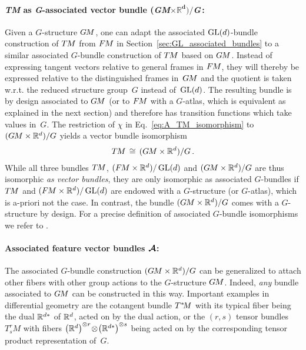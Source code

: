 \paragraph{\textit{TM} as \textit{G}-associated vector bundle (\textit{GM}$\boldsymbol{\times \mathds{R}^d)/}$\textit{G}\,:}

Given a $G$-structure $G\mkern-1.4muM$, one can adapt the associated $\operatorname{GL}(d)$-bundle construction of $T\mkern-1.5muM$ from $F\mkern-1.5muM$ in Section~\ref{sec:GL_associated_bundles} to a similar associated $G$-bundle construction of $T\mkern-1.5muM$ based on $G\mkern-1.4muM$.
Instead of expressing tangent vectors relative to general frames in $F\mkern-1.5muM$, they will thereby be expressed relative to the distinguished frames in~$G\mkern-1.4muM$ and the quotient is taken w.r.t. the reduced structure group~$G$ instead of~$\operatorname{GL}(d)$.
The resulting bundle is by design associated to $G\mkern-1.4muM$ (or to $F\mkern-1.5muM$ with a $G$-atlas, which is equivalent as explained in the next section) and therefore has transition functions which take values in~$G$.
The restriction of $\chi$ in Eq.~\eqref{eq:A_TM_isomorphism} to $(G\mkern-1.4muM\times\mathbb{R}^d)/G$ yields a vector bundle isomorphism
\begin{align}
    T\mkern-1.5muM\, \cong\, (G\mkern-1.4muM\times\mathbb{R}^d)/G \,.
\end{align}
While all three bundles $T\mkern-1.5muM$, $(F\mkern-1.5muM\times\mathbb{R}^d)/\operatorname{GL}(d)$ and $(G\mkern-1.4muM\times\mathbb{R}^d)/G$ are thus isomorphic \emph{as vector bundles}, they are only isomorphic as associated $G$-bundles if $T\mkern-1.5muM$ and $(F\mkern-1.5muM\times\mathbb{R}^d)/\operatorname{GL}(d)$ are endowed with a $G$-structure (or $G$-atlas), which is a-priori not the case.
In contrast, the bundle $(G\mkern-1.4muM\times\mathbb{R}^d)/G$ comes with a $G$-structure by design.
For a precise definition of associated $G$-bundle isomorphisms we refer to \cite{schullerGeometricalAnatomy2016}.









\paragraph{Associated feature vector bundles $\boldsymbol{\mathcal{A}}$:}
The associated $G$-bundle construction $(G\mkern-1.4muM\times\mathbb{R}^d)/G$ can be generalized to attach other fibers with other group actions to the $G$-structure $G\mkern-1.4muM$.
Indeed, \emph{any} bundle associated to $G\mkern-1.4muM$ can be constructed in this way.
Important examples in differential geometry are the cotangent bundle $T^{\mkern0.5mu *}\mkern-3.5muM$ with its typical fiber being the dual $\mathbb{R}^{d*}$ of $\mathbb{R}^d$, acted on by the dual action, or the $(r,s)$ tensor bundles $T^r_s\!M$ with fibers $\big(\mathbb{R}^d\big)^{\otimes r}\! \otimes\! \big(\mathbb{R}^{d*}\big)^{\otimes s}$ being acted on by the corresponding tensor product representation of~$G$.

